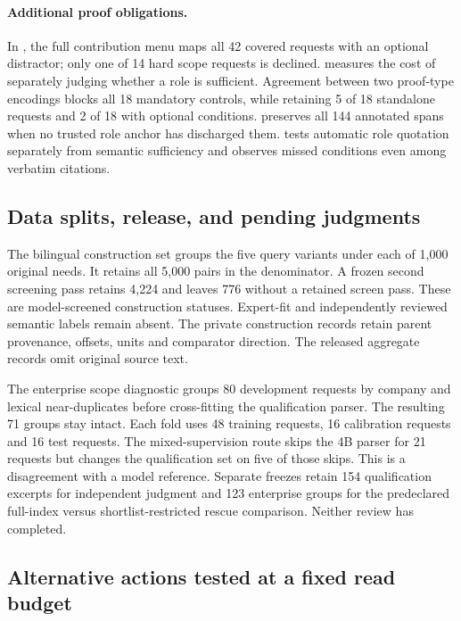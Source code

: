 \paragraph{Additional proof obligations.}
In , the full contribution menu maps all 42 covered requests with an optional distractor; only one of 14 hard scope requests is declined.  measures the cost of separately judging whether a role is sufficient. Agreement between two proof-type encodings blocks all 18 mandatory controls, while retaining 5 of 18 standalone requests and 2 of 18 with optional conditions.  preserves all 144 annotated spans when no trusted role anchor has discharged them.  tests automatic role quotation separately from semantic sufficiency and observes missed conditions even among verbatim citations.

\subsection{Data splits, release, and pending judgments}
The bilingual construction set groups the five query variants under each of 1,000 original needs. It retains all 5,000 pairs in the denominator. A frozen second screening pass retains 4,224 and leaves 776 without a retained screen pass. These are model-screened construction statuses. Expert-fit and independently reviewed semantic labels remain absent. The private construction records retain parent provenance, offsets, units and comparator direction. The released aggregate records omit original source text.

The enterprise scope diagnostic groups 80 development requests by company and lexical near-duplicates before cross-fitting the qualification parser. The resulting 71 groups stay intact. Each fold uses 48 training requests, 16 calibration requests and 16 test requests. The mixed-supervision route skips the 4B parser for 21 requests but changes the qualification set on five of those skips. This is a disagreement with a model reference. Separate freezes retain 154 qualification excerpts for independent judgment and 123 enterprise groups for the predeclared full-index versus shortlist-restricted rescue comparison. Neither review has completed.

\subsection{Alternative actions tested at a fixed read budget}
